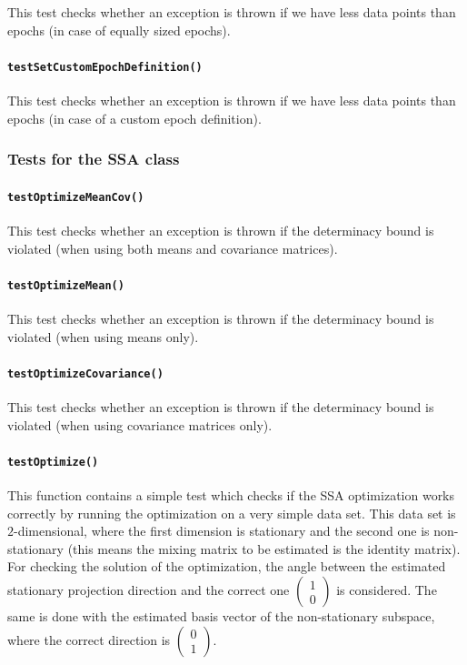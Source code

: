 \documentclass{article}
\newcommand{\1}{\ensuremath{\mathds{1}}}
\newcommand{\0}{\ensuremath{0}}
\begin{document}
This test checks whether an exception is thrown if we have less data points than epochs (in case of equally sized epochs).

\paragraph{\texttt{testSetCustomEpochDefinition()}}

This test checks whether an exception is thrown if we have less data points than epochs (in case of a custom epoch definition).

\subsubsection*{Tests for the SSA class}

\paragraph{\texttt{testOptimizeMeanCov()}}

This test checks whether an exception is thrown if the determinacy bound is violated (when using both means and covariance matrices).

\paragraph{\texttt{testOptimizeMean()}}

This test checks whether an exception is thrown if the determinacy bound is violated (when using means only).

\paragraph{\texttt{testOptimizeCovariance()}}

This test checks whether an exception is thrown if the determinacy bound is violated (when using covariance matrices only).

\paragraph{\texttt{testOptimize()}}

This function contains a simple test which checks
if the SSA optimization works correctly by running the optimization on a very simple data set. This data set is $2$-dimensional, where
the first dimension is stationary and the second one is non-stationary (this means the mixing matrix to be estimated is the identity matrix).
For checking the solution of the optimization, the angle between the estimated stationary projection direction and the correct one
$\begin{pmatrix} 1 \\ 0\end{pmatrix}$ is considered. The same is done with the estimated basis vector of the non-stationary subspace,
where the correct direction is $\begin{pmatrix} 0 \\ 1\end{pmatrix}$.
\end{document}
